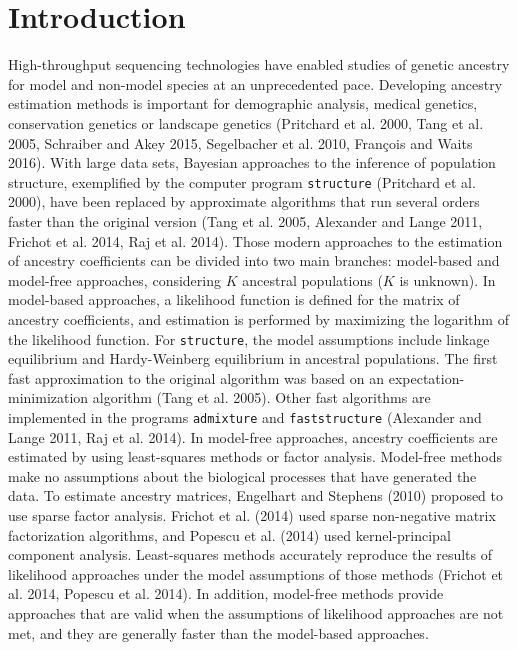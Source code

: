 \section{Introduction}

 High-throughput sequencing technologies have enabled studies of genetic ancestry for model and non-model species at an unprecedented pace. Developing ancestry estimation methods is important for demographic analysis, medical genetics, conservation genetics or landscape genetics (Pritchard et al. 2000, Tang et al. 2005, Schraiber and Akey 2015, Segelbacher et al. 2010, Fran\c cois and Waits 2016).  With large data sets, Bayesian approaches to the inference of population structure, exemplified by the computer program {\tt structure} (Pritchard et al. 2000), have been replaced by approximate algorithms that run several orders faster than the original version (Tang et al. 2005, Alexander and Lange 2011, Frichot et al. 2014, Raj et al. 2014).  Those modern approaches to the estimation of ancestry coefficients can be  divided into two main branches: model-based and model-free approaches, considering $K$ ancestral populations ($K$ is unknown). In model-based approaches, a likelihood function is defined for the matrix of ancestry coefficients, and estimation is performed by maximizing the logarithm of the likelihood function. For {\tt structure}, the model assumptions include linkage equilibrium and Hardy-Weinberg equilibrium in ancestral populations. The first fast approximation to the original algorithm was based on an expectation-minimization algorithm (Tang et al. 2005). Other fast algorithms are implemented in the programs {\tt admixture}  and {\tt faststructure} (Alexander and Lange 2011, Raj et al. 2014). In model-free approaches, ancestry coefficients are estimated by using least-squares methods or factor analysis. Model-free methods make no assumptions about the biological processes that have generated the data. To estimate ancestry matrices, Engelhart and Stephens (2010) proposed to use sparse factor analysis. Frichot et al. (2014) used sparse non-negative matrix factorization algorithms, and Popescu et al. (2014) used kernel-principal component analysis. Least-squares methods accurately reproduce the results of likelihood approaches under the model assumptions of those methods (Frichot et al. 2014, Popescu et al. 2014).  In addition, model-free methods provide approaches that are valid when the assumptions of likelihood approaches are not met, and they are generally faster than the model-based approaches. 
   
